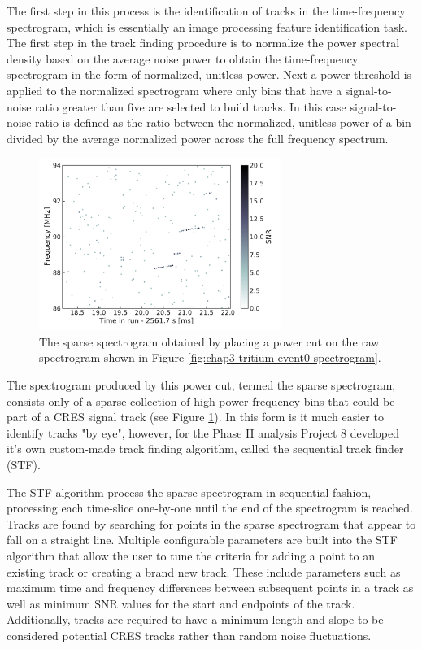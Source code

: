 The first step in this process is the identification of tracks in the time-frequency spectrogram, which is essentially an image processing feature identification task. The first step in the track finding procedure is to normalize the power spectral density based on the average noise power to obtain the time-frequency spectrogram in the form of normalized, unitless power. Next a power threshold is applied to the normalized spectrogram where only bins that have a signal-to-noise ratio greater than five are selected to build tracks. In this case signal-to-noise ratio is defined as the ratio between the normalized, unitless power of a bin divided by the average normalized power across the full frequency spectrum.

\begin{figure}[htbp]
    \centering
    \includegraphics*[width=0.7\textwidth]{figs/Chapter-3/230621_t_event_zero_sparse_spectrogram_zoom.pdf}
    \caption{\label{fig:chap3-sparse-spectrogram} The sparse spectrogram obtained by placing a power cut on the raw spectrogram shown in Figure \ref{fig:chap3-tritium-event0-spectrogram}.}
\end{figure}

The spectrogram produced by this power cut, termed the sparse spectrogram, consists only of a sparse collection of high-power frequency bins that could be part of a CRES signal track (see Figure \ref{fig:chap3-sparse-spectrogram}). In this form is it much easier to identify tracks "by eye", however, for the Phase II analysis Project 8 developed it's own custom-made track finding algorithm, called the sequential track finder (STF). 

The STF algorithm process the sparse spectrogram in sequential fashion, processing each time-slice one-by-one until the end of the spectrogram is reached. Tracks are found by searching for points in the sparse spectrogram that appear to fall on a straight line. Multiple configurable parameters are built into the STF algorithm that allow the user to tune the criteria for adding a point to an existing track or creating a brand new track. These include parameters such as maximum time and frequency differences between subsequent points in a track as well as minimum SNR values for the start and endpoints of the track. Additionally, tracks are required to have a minimum length and slope to be considered potential CRES tracks rather than random noise fluctuations. 


